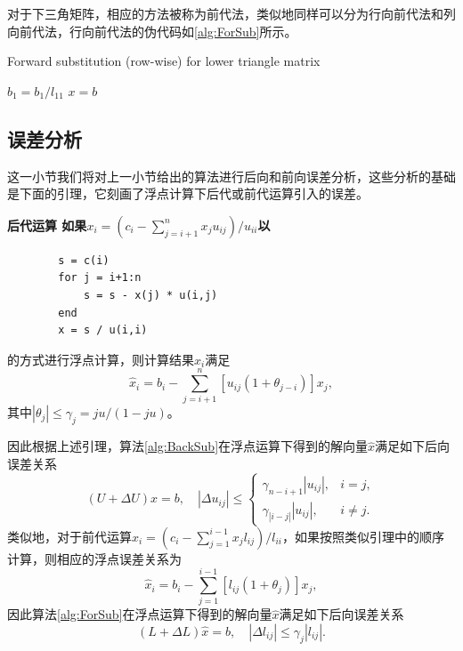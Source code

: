 \documentclass[a4paper,10pt]{ctexart}
\begin{document}
对于下三角矩阵，相应的方法被称为前代法，类似地同样可以分为行向前代法和列向前代法，行向前代法的伪代码如\ref{alg:ForSub}所示。
\begin{algorithm}[htbp]
    \caption{Forward substitution (row-wise) for lower triangle matrix}\label{alg:ForSub}
    $ b_1 = b_1/l_{11} $\;
    \Return $ x = b $\;
\end{algorithm}

\subsection{误差分析}
这一小节我们将对上一小节给出的算法进行后向和前向误差分析，这些分析的基础是下面的引理，它刻画了浮点计算下后代或前代运算引入的误差。
\begin{lemma}\bf{\textup{后代运算}}
    如果$ x_i = (c_i - \sum_{j=i+1}^{n}x_{j} u_{ij})/u_{ii} $以
    \begin{verbatim}
        s = c(i)
        for j = i+1:n
            s = s - x(j) * u(i,j)
        end
        x = s / u(i,i)
    \end{verbatim}
    的方式进行浮点计算，则计算结果$ \hat{x}_i $满足
    \begin{equation}
        [u_{ii}(1+\theta_{n-i+1})] \hat{x}_i = b_i - \sum_{j=i+1}^{n} [u_{ij}(1+\theta_{j-i})]x_j,
    \end{equation}
    其中$ |\theta_j|\leqslant \gamma_j = ju / (1-ju) $。
\end{lemma}
因此根据上述引理，算法\ref{alg:BackSub}在浮点运算下得到的解向量$ \hat{x} $满足如下后向误差关系
\begin{equation}
    (U+\Delta U) \hat{x} = b,\quad 
    |\Delta u_{ij}| \leqslant 
    \begin{cases}
        \gamma_{n-i+1}|u_{ij}|, & i=j,\\
        \gamma_{|i-j|}|u_{ij}|, & i\ne j.
    \end{cases}
\end{equation}
类似地，对于前代运算$ x_i = (c_i - \sum_{j=1}^{i-1}x_{j} l_{ij})/l_{ii} $，如果按照类似引理中的顺序计算，则相应的浮点误差关系为
\begin{equation}
    [l_{ii}(1+\theta_{i})] \hat{x}_i = b_i - \sum_{j=1}^{i-1} [l_{ij}(1+\theta_{j})]x_j,
\end{equation}
因此算法\ref{alg:ForSub}在浮点运算下得到的解向量$ \hat{x} $满足如下后向误差关系
\begin{equation}
    (L+\Delta L) \hat{x} = b,\quad 
    |\Delta l_{ij}| \leqslant \gamma_j |l_{ij}|.
\end{equation}
\end{document}
